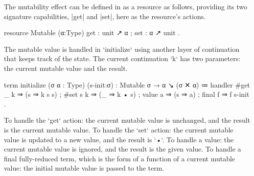 The mutability effect can be defined in \LangD as a resource as follows, providing its two signature capabilities, \code|get| and \code|set|, here as the resource's actions.
%
\begin{program}[caption={Resource for mutability}]
resource Mutable (α:Type)
  { get : unit ↗ α
  ; set : α ↗ unit }.
\end{program}
%
The mutable value is handled in \code`initialize` using another layer of continuation that keeps track of the state.
The current continuation \code`k` has two parameters:
the current mutable value and the result.
\begin{program}[caption={Handler for mutability}]
term initialize (σ α : Type) (s-init:σ) : Mutable σ → α ↘ (σ ✕ α)
  ≔ handler
      { #get  _ k ⇒ (s ⇒ k s s)
      ; #set  s k ⇒ (_ ⇒ k • s)
      ; value   a ⇒ (s ⇒ a)
      ; final   f ⇒ f s-init }.
\end{program}
%
To handle the \code`get` action: the current mutable value is unchanged, and the result is the current mutable value.
To handle the \code`set` action: the current mutable value is updated to a new value, and the result is \code`•`.
To handle a value: the current mutable value is ignored, and the result is the given value.
To handle a final fully-reduced term, which is the form of a function of a current mutable value: the initial mutable value is passed to the term.

